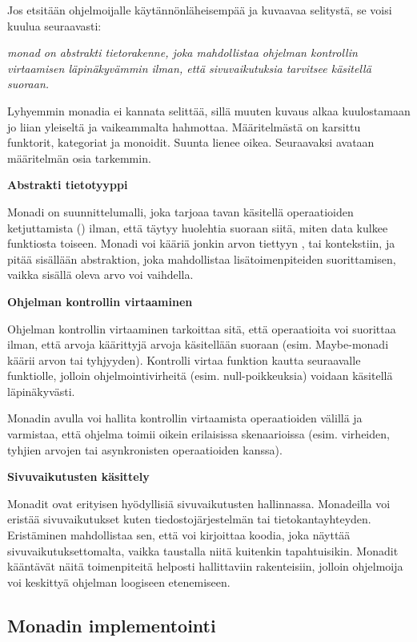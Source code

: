 Jos etsitään ohjelmoijalle käytännönläheisempää ja kuvaavaa selitystä, se voisi kuulua seuraavasti:

\textit{\Gls{monad} on abstrakti tietorakenne, joka mahdollistaa ohjelman kontrollin virtaamisen läpinäkyvämmin ilman, että sivuvaikutuksia tarvitsee käsitellä suoraan.}

Lyhyemmin monadia ei kannata selittää, sillä muuten kuvaus alkaa kuulostamaan jo liian yleiseltä ja vaikeammalta hahmottaa. Määritelmästä on karsittu funktorit, kategoriat ja monoidit. Suunta lienee oikea. Seuraavaksi avataan määritelmän osia tarkemmin.

\textbf{Abstrakti tietotyyppi}

Monadi on suunnittelumalli, joka tarjoaa tavan käsitellä operaatioiden ketjuttamista () ilman, että täytyy huolehtia suoraan siitä, miten data kulkee funktiosta toiseen. Monadi voi kääriä jonkin arvon tiettyyn , tai kontekstiin, ja pitää sisällään abstraktion, joka mahdollistaa lisätoimenpiteiden suorittamisen, vaikka sisällä oleva arvo voi vaihdella.

\textbf{Ohjelman kontrollin virtaaminen}

Ohjelman kontrollin virtaaminen tarkoittaa sitä, että operaatioita voi suorittaa ilman, että arvoja käärittyjä arvoja käsitellään suoraan (esim. Maybe-monadi käärii arvon tai tyhjyyden). Kontrolli virtaa funktion kautta seuraavalle funktiolle, jolloin ohjelmointivirheitä (esim. null-poikkeuksia) voidaan käsitellä läpinäkyvästi.

Monadin avulla voi hallita kontrollin virtaamista operaatioiden välillä ja varmistaa, että ohjelma toimii oikein erilaisissa skenaarioissa (esim. virheiden, tyhjien arvojen tai asynkronisten operaatioiden kanssa).

\textbf{Sivuvaikutusten käsittely}

Monadit ovat erityisen hyödyllisiä sivuvaikutusten hallinnassa. Monadeilla voi eristää sivuvaikutukset kuten tiedostojärjestelmän tai tietokantayhteyden. Eristäminen mahdollistaa sen, että voi kirjoittaa koodia, joka näyttää sivuvaikutuksettomalta, vaikka taustalla niitä kuitenkin tapahtuisikin. Monadit kääntävät näitä toimenpiteitä helposti hallittaviin rakenteisiin, jolloin ohjelmoija voi keskittyä ohjelman loogiseen etenemiseen.

\subsection{Monadin implementointi}

